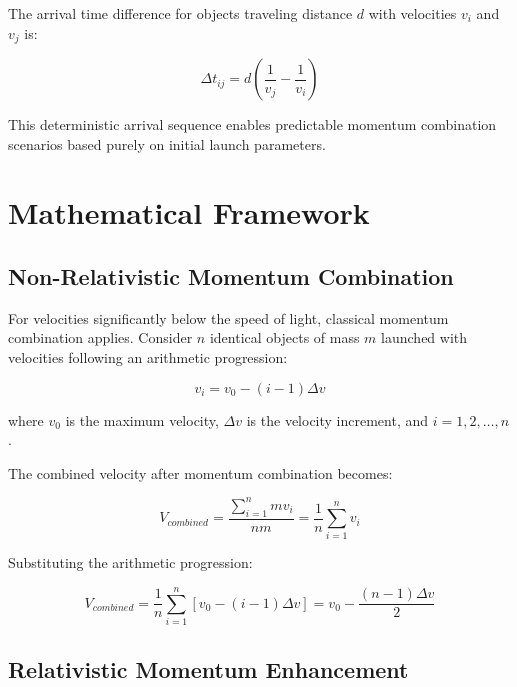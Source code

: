 \documentclass[11pt,a4paper]{article}
\theoremstyle{remark}
\begin{document}
The arrival time difference for objects traveling distance $d$ with velocities $v_i$ and $v_j$ is:

\begin{equation}
\Delta t_{ij} = d\left(\frac{1}{v_j} - \frac{1}{v_i}\right)
\label{eq:arrival_time_difference}
\end{equation}

This deterministic arrival sequence enables predictable momentum combination scenarios based purely on initial launch parameters.

\section{Mathematical Framework}

\subsection{Non-Relativistic Momentum Combination}

For velocities significantly below the speed of light, classical momentum combination applies. Consider $n$ identical objects of mass $m$ launched with velocities following an arithmetic progression:

\begin{equation}
v_i = v_0 - (i-1)\Delta v
\label{eq:velocity_progression}
\end{equation}

where $v_0$ is the maximum velocity, $\Delta v$ is the velocity increment, and $i = 1, 2, \ldots, n$.

The combined velocity after momentum combination becomes:

\begin{equation}
V_{combined} = \frac{\sum_{i=1}^{n} m v_i}{nm} = \frac{1}{n}\sum_{i=1}^{n} v_i
\label{eq:classical_combined_velocity}
\end{equation}

Substituting the arithmetic progression:

\begin{equation}
V_{combined} = \frac{1}{n}\sum_{i=1}^{n} [v_0 - (i-1)\Delta v] = v_0 - \frac{(n-1)\Delta v}{2}
\label{eq:arithmetic_combined_velocity}
\end{equation}

\subsection{Relativistic Momentum Enhancement}
\end{document}
